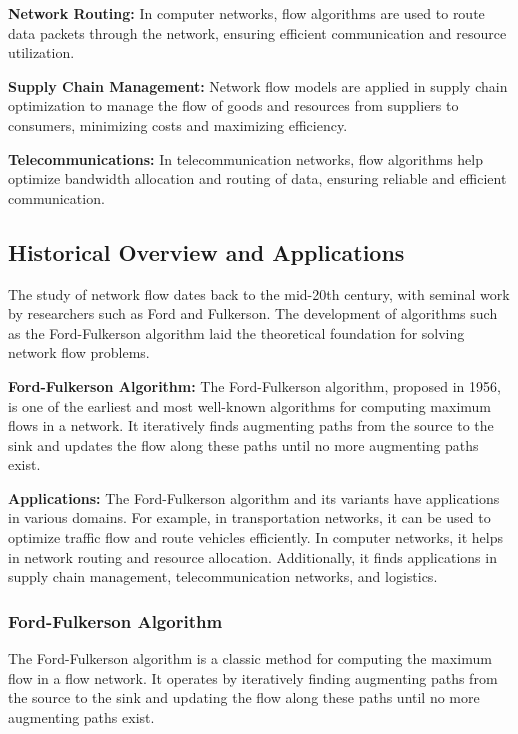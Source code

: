 \documentclass[12pt]{book} %
\begin{document}
\textbf{Network Routing:} In computer networks, flow algorithms are used to route data packets through the network, ensuring efficient communication and resource utilization.

\textbf{Supply Chain Management:} Network flow models are applied in supply chain optimization to manage the flow of goods and resources from suppliers to consumers, minimizing costs and maximizing efficiency.

\textbf{Telecommunications:} In telecommunication networks, flow algorithms help optimize bandwidth allocation and routing of data, ensuring reliable and efficient communication.

\subsection{Historical Overview and Applications}

The study of network flow dates back to the mid-20th century, with seminal work by researchers such as Ford and Fulkerson. The development of algorithms such as the Ford-Fulkerson algorithm laid the theoretical foundation for solving network flow problems.

\textbf{Ford-Fulkerson Algorithm:} The Ford-Fulkerson algorithm, proposed in 1956, is one of the earliest and most well-known algorithms for computing maximum flows in a network. It iteratively finds augmenting paths from the source to the sink and updates the flow along these paths until no more augmenting paths exist.

\textbf{Applications:} The Ford-Fulkerson algorithm and its variants have applications in various domains. For example, in transportation networks, it can be used to optimize traffic flow and route vehicles efficiently. In computer networks, it helps in network routing and resource allocation. Additionally, it finds applications in supply chain management, telecommunication networks, and logistics.

\FloatBarrier
\subsubsection{Ford-Fulkerson Algorithm}
The Ford-Fulkerson algorithm is a classic method for computing the maximum flow in a flow network. It operates by iteratively finding augmenting paths from the source to the sink and updating the flow along these paths until no more augmenting paths exist.
\end{document}
